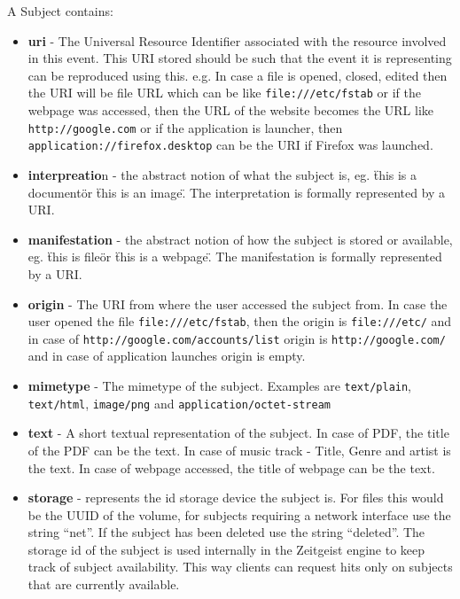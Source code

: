 \noindent
A Subject contains:
\begin{itemize}
\item \textbf{uri} - The Universal Resource Identifier associated with the resource involved 
in this event. This URI stored should be such that the event it is representing can 
be reproduced using this. e.g. In case a file is opened, closed, edited then the URI 
will be file URL which can be like \texttt{file:///etc/fstab} or if the webpage was 
accessed, then the URL of the website becomes the URL like \texttt{http://google.com} 
or if the application is launcher, then \texttt{application://firefox.desktop} 
can be the URI if Firefox was launched.
\item \textbf{interpreatio}n - the abstract notion of what the subject is, eg. \"this is a document\" or \"this is an image\". The interpretation is formally represented by a URI.
\item \textbf{manifestation} - the abstract notion of how the subject is stored or available, eg. \"this is file\" or \"this is a webpage\". The manifestation is formally represented by a URI.
\item \textbf{origin} - The URI from where the user accessed the subject from. In case the user 
opened the file \texttt{file:///etc/fstab}, then the origin is \texttt{file:///etc/} and 
in case of \texttt{http://google.com/accounts/list} origin is \texttt{http://google.com/} 
and in case of application launches origin is empty.
\item \textbf{mimetype} - The mimetype of the subject. Examples are \texttt{text/plain}, 
\texttt{text/html}, \texttt{image/png} and \texttt{application/octet-stream}
\item \textbf{text} - A short textual representation of the subject. In case of PDF, the title of 
the PDF can be the text. In case of music track - Title, Genre and artist is the text. In 
case of webpage accessed, the title of webpage can be the text.
\item \textbf{storage} -  represents the id storage device the subject is. For files this would be the UUID of the volume, for subjects requiring a network interface use the 
string “net”. If the subject has been deleted use the string “deleted”. The storage id 
of the subject is used internally in the Zeitgeist engine to keep track of subject 
availability. This way clients can request hits only on subjects that are 
currently available.
\end{itemize}